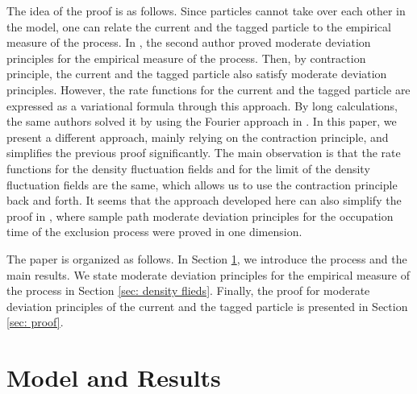 \documentclass[reqno,11pt]{amsart}
\numberwithin{equation}{section}
\begin{document}
The idea of the proof is as follows. Since particles cannot take over each other in the model, one can relate the current and the tagged particle to the empirical measure of the process. In \cite{zhao2024moderate}, the second author proved moderate deviation principles for the empirical measure of the process. Then, by contraction principle, the current and the tagged particle also satisfy moderate deviation principles. However, the rate functions for the current and the tagged particle are expressed as a  variational formula through this approach. By long calculations, the same authors solved it by using the Fourier approach in \cite{xue2023moderate,xue2024sample}. In this paper, we present a different approach, mainly relying on the contraction principle, and simplifies the previous proof significantly. The main observation is that the rate functions for the density fluctuation fields and for the limit of the density fluctuation fields are the same, which allows us to use the contraction principle back and forth. It seems that the approach developed here can also simplify the proof in \cite{zhao2024moderate}, where sample path moderate deviation principles for the occupation time of the exclusion process were proved in one dimension. 

The paper is organized as follows. In Section \ref{sec: model}, we introduce the process and the main results. We state moderate deviation principles for the empirical measure of the process in Section \ref{sec: density flieds}. Finally, the proof for moderate deviation principles of the current and the tagged particle is presented in Section \ref{sec: proof}.

\section{Model and Results}\label{sec: model}
\end{document}
